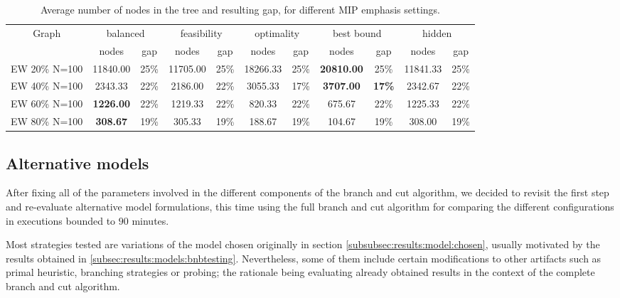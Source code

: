 \begin{sidewaystable}[h]
\centering

\begin{tabular}{|c|cc|cc|cc|cc|cc|}
\hline
\multicolumn{1}{|c|}{Graph} & \multicolumn{2}{|c|}{balanced} & \multicolumn{2}{|c|}{feasibility} & \multicolumn{2}{|c|}{optimality} & \multicolumn{2}{|c|}{best bound} & \multicolumn{2}{|c|}{hidden}
\\
 & nodes & gap & nodes & gap & nodes & gap & nodes & gap & nodes & gap
\\
\hline
EW 20\% N=100 & 11840.00 &25\% & 11705.00 &25\% & 18266.33 &25\% & \textbf{20810.00} &25\% & 11841.33 &25\%
\\
EW 40\% N=100 & 2343.33 &22\% & 2186.00 &22\% & 3055.33 &17\% & \textbf{3707.00} & \textbf{17\%} & 2342.67 &22\%
\\
EW 60\% N=100 & \textbf{1226.00} &22\% & 1219.33 &22\% & 820.33 &22\% & 675.67 &22\% & 1225.33 &22\%
\\
EW 80\% N=100 & \textbf{308.67} &19\% & 305.33 &19\% & 188.67 &19\% & 104.67 &19\% & 308.00 &19\%
\\
\hline 
\end{tabular}

\caption{Average number of nodes in the tree and resulting gap, for different MIP emphasis settings.}
\label{table:bnc:emph}

\end{sidewaystable}

\clearpage

\subsection{Alternative models}

After fixing all of the parameters involved in the different components of the branch and cut algorithm, we decided to revisit the first step and re-evaluate alternative model formulations, this time using the full branch and cut algorithm for comparing the different configurations in executions bounded to $90$ minutes.

Most strategies tested are variations of the model chosen originally in section \ref{subsubsec:results:model:chosen}, usually motivated by the results obtained in \ref{subsec:results:models:bnbtesting}. Nevertheless, some of them include certain modifications to other artifacts such as primal heuristic, branching strategies or probing; the rationale being evaluating already obtained results in the context of the complete branch and cut algorithm.

